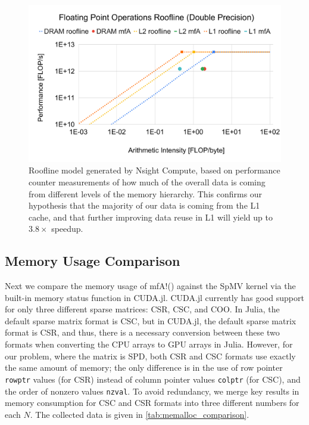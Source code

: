 \begin{figure}
    \centering
    \includegraphics[width=\linewidth]{figures/Floating_Point_Operations_Roofline_Double_Precision.pdf}
    \caption{
    Roofline model generated by Nsight Compute, based on performance counter measurements of how much of the overall data is coming from different levels of the memory hierarchy.
    This confirms our hypothesis that the majority of our data is coming from the L1 cache, and that further improving data reuse in L1 will yield up to $3.8\times$ speedup.
    }
    \label{fig:roofline-double-precision}
\end{figure}




\subsection{Memory Usage Comparison}
Next we compare the memory usage of {\ttfamily mfA!}() against the SpMV kernel via the built-in memory status function in CUDA.jl. 
CUDA.jl currently has good support for only three different sparse matrices: CSR, CSC, and COO.
In Julia, the default sparse matrix format is CSC, but in CUDA.jl, the default sparse matrix format is CSR, and thus, there is a necessary conversion between these two formats when converting the CPU arrays to GPU arrays in Julia. 
However, for our problem, where the matrix is SPD, both CSR and CSC formats use exactly the same amount of memory; the only difference is in the use of row pointer \texttt{rowptr} values (for CSR) instead of column pointer values \texttt{colptr} (for CSC), and the order of nonzero values \texttt{nzval}. 
To avoid redundancy, we merge key results in memory consumption for CSC and CSR formats into three different numbers for each $N$.
The collected data is given in \autoref{tab:memalloc_comparison}. 
\label{sec:mem_comp}


